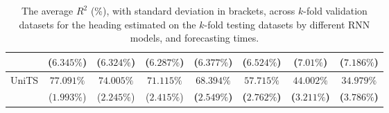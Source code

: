 \begin{table}[!ht]
{\begin{tabular}{|c|c|c|c|c|c|c|c|}
			 & ($6.345\%$) & ($6.324\%$) & ($6.287\%$) & ($6.377\%$) & ($6.524\%$) & ($7.01\%$) & ($7.186\%$) \\ \hline
			\multirow{2}{*}{UniTS} & $77.091\%$ & $74.005\%$ & $71.115\%$ & $\mathbf{68.394\%}$ & $\mathbf{57.715\%}$ & $\mathbf{44.002\%}$ & $\mathbf{34.979\%}$ \\
			 & ($1.993\%$) & ($2.245\%$) & ($2.415\%$) & \textbf{(}$\mathbf{2.549\%}$\textbf{)} & \textbf{(}$\mathbf{2.762\%}$\textbf{)} & \textbf{(}$\mathbf{3.211\%}$\textbf{)} & \textbf{(}$\mathbf{3.786\%}$\textbf{)} \\ \hline
		\end{tabular}
	}
	\caption{The average $R^{2}$ (\%), with standard deviation in brackets, across $k$-fold validation datasets for the heading estimated on the $k$-fold testing datasets by different RNN models, and forecasting times.}
	\label{tab:all_direction_R2}
\end{table}

